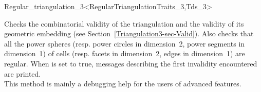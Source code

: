 \begin{ccRefClass}{Regular_triangulation_3<RegularTriangulationTraits_3,Tds_3>}
\begin{ccAdvanced}
{Checks the combinatorial validity of the triangulation and the
validity of its geometric embedding (see
Section~\ref{Triangulation3-sec-Valid}). Also checks that all the
power spheres (resp. power circles in dimension~2, power segments in
dimension~1) of cells (resp. facets in dimension~2, edges in
dimension~1) are regular. When 
is set to true, messages describing the first invalidity encountered
are printed.\\ This method is mainly a debugging help for the users of
advanced features.
}

\end{ccAdvanced}




\end{ccRefClass}


